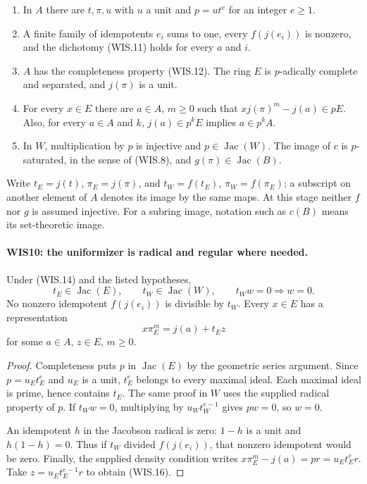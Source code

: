 \documentclass[11pt,a4paper]{article}
\numberwithin{equation}{section}
\theoremstyle{remark}\newtheorem{remark}[theorem]{Remark}
\begin{document}
\begin{enumerate}
\item In $A$ there are $t,\pi,u$ with $u$ a unit and
      $p=ut^e$ for an integer $e\geq1$.
\item A finite family of idempotents $e_i$ sums to one,
      every $f(j(e_i))$ is nonzero, and the dichotomy
      (WIS.11) holds for every $a$ and $i$.
\item $A$ has the completeness property (WIS.12).
      The ring $E$ is $p$-adically complete and separated,
      and $j(\pi)$ is a unit.
\item For every $x\in E$ there are $a\in A$, $m\geq0$ such that
      $xj(\pi)^m-j(a)\in pE$. Also, for every $a\in A$ and $k$,
      $j(a)\in p^kE$ implies $a\in p^kA$.
\item In $W$, multiplication by $p$ is injective and
      $p\in\operatorname{Jac}(W)$. The image of $c$ is
      $p$-saturated, in the sense of (WIS.8), and
      $g(\pi)\in\operatorname{Jac}(B)$.
\end{enumerate}

Write $t_E=j(t)$, $\pi_E=j(\pi)$, and
$t_W=f(t_E)$, $\pi_W=f(\pi_E)$; a subscript on another
element of $A$ denotes its image by the same maps.
At this stage neither $f$ nor $g$ is assumed injective.
For a subring image, notation such as $c(B)$ means its
set-theoretic image.

\paragraph{WIS10: the uniformizer is radical and regular where needed.}
\label{claim:WIS10}
Under (WIS.14) and the listed hypotheses,
\[
 t_E\in\operatorname{Jac}(E),\qquad
 t_W\in\operatorname{Jac}(W),\qquad
 t_Ww=0\Longrightarrow w=0.                                \tag{WIS.15}
\]
No nonzero idempotent $f(j(e_i))$ is divisible by $t_W$.
Every $x\in E$ has a representation
\[
                     x\pi_E^m=j(a)+t_Ez                   \tag{WIS.16}
\]
for some $a\in A$, $z\in E$, $m\geq0$.

\begin{proof}
Completeness puts $p$ in $\operatorname{Jac}(E)$ by the
geometric series argument. Since $p=u_Et_E^e$ and $u_E$
is a unit, $t_E^e$ belongs to every maximal ideal.
Each maximal ideal is prime, hence contains $t_E$.
The same proof in $W$ uses the supplied radical property
of $p$. If $t_Ww=0$, multiplying by $u_Wt_W^{e-1}$
gives $pw=0$, so $w=0$.

An idempotent $h$ in the Jacobson radical is zero:
$1-h$ is a unit and $h(1-h)=0$. Thus if $t_W$ divided
$f(j(e_i))$, that nonzero idempotent would be zero.
Finally, the supplied density condition writes
$x\pi_E^m-j(a)=pr=u_Et_E^er$.
Take $z=u_Et_E^{e-1}r$ to obtain (WIS.16).
\end{proof}
\end{document}
